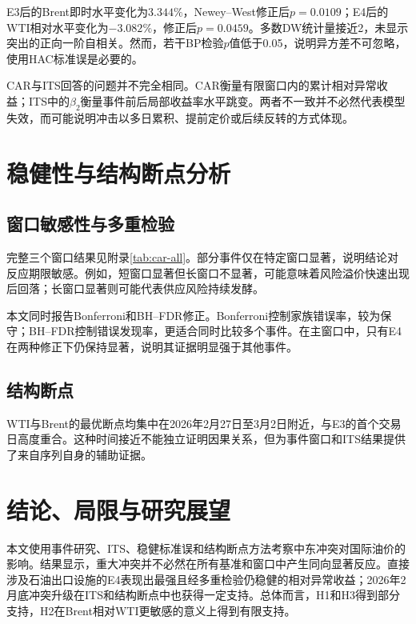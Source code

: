 \documentclass[UTF8,zihao=-4,a4paper]{ctexart}
\begin{document}
E3后的Brent即时水平变化为$3.344\%$，Newey--West修正后$p=0.0109$；E4后的WTI相对水平变化为$-3.082\%$，修正后$p=0.0459$。多数DW统计量接近2，未显示突出的正向一阶自相关。然而，若干BP检验$p$值低于0.05，说明异方差不可忽略，使用HAC标准误是必要的。

CAR与ITS回答的问题并不完全相同。CAR衡量有限窗口内的累计相对异常收益；ITS中的$\beta_2$衡量事件前后局部收益率水平跳变。两者不一致并不必然代表模型失效，而可能说明冲击以多日累积、提前定价或后续反转的方式体现。

\section{稳健性与结构断点分析}

\subsection{窗口敏感性与多重检验}

完整三个窗口结果见附录\cref{tab:car-all}。部分事件仅在特定窗口显著，说明结论对反应期限敏感。例如，短窗口显著但长窗口不显著，可能意味着风险溢价快速出现后回落；长窗口显著则可能代表供应风险持续发酵。

本文同时报告Bonferroni和BH--FDR修正。Bonferroni控制家族错误率，较为保守；BH--FDR控制错误发现率，更适合同时比较多个事件。在主窗口中，只有E4在两种修正下仍保持显著，说明其证据明显强于其他事件。

\subsection{结构断点}

\begin{table}[H]
  \centering
  \caption{BIC最优结构断点候选}
  \label{tab:breaks}
  \small
  
\end{table}

WTI与Brent的最优断点均集中在2026年2月27日至3月2日附近，与E3的首个交易日高度重合。这种时间接近不能独立证明因果关系，但为事件窗口和ITS结果提供了来自序列自身的辅助证据。

\section{结论、局限与研究展望}

本文使用事件研究、ITS、稳健标准误和结构断点方法考察中东冲突对国际油价的影响。结果显示，重大冲突并不必然在所有基准和窗口中产生同向显著反应。直接涉及石油出口设施的E4表现出最强且经多重检验仍稳健的相对异常收益；2026年2月底冲突升级在ITS和结构断点中也获得一定支持。总体而言，H1和H3得到部分支持，H2在Brent相对WTI更敏感的意义上得到有限支持。
\end{document}

